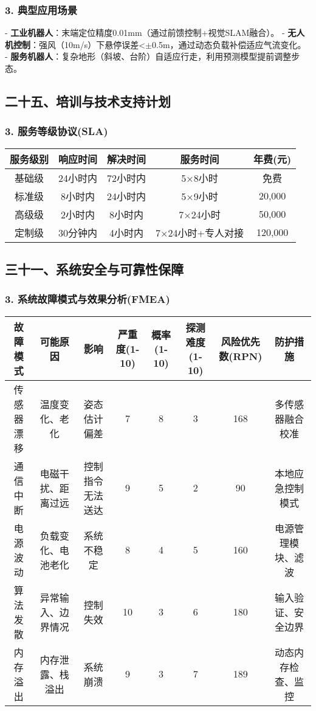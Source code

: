 \documentclass[12pt, a4paper]{article}
\begin{document}
\subsubsection{3. 典型应用场景}
- \textbf{工业机器人}：末端定位精度0.01mm（通过前馈控制+视觉SLAM融合）。
- \textbf{无人机控制}：强风（10m/s）下悬停误差<$\pm$0.5m，通过动态负载补偿适应气流变化。
- \textbf{服务机器人}：复杂地形（斜坡、台阶）自适应行走，利用预测模型提前调整步态。

\subsection{二十五、培训与技术支持计划}

\subsubsection{3. 服务等级协议(SLA)}

\begin{longtable}{|c|c|c|c|c|}
\hline
服务级别 & 响应时间 & 解决时间 & 服务时间 & 年费(元) \\
\hline
基础级 & 24小时内 & 72小时内 & 5×8小时 & 免费 \\
\hline
标准级 & 8小时内 & 24小时内 & 5×9小时 & 20,000 \\
\hline
高级级 & 2小时内 & 8小时内 & 7×24小时 & 50,000 \\
\hline
定制级 & 30分钟内 & 4小时内 & 7×24小时+专人对接 & 120,000 \\
\hline
\end{longtable}

\subsection{三十一、系统安全与可靠性保障}

\subsubsection{3. 系统故障模式与效果分析(FMEA)}

\begin{longtable}{|c|c|c|c|c|c|c|c|}
\hline
故障模式 & 可能原因 & 影响 & 严重度(1-10) & 概率(1-10) & 探测难度(1-10) & 风险优先数(RPN) & 防护措施 \\
\hline
传感器漂移 & 温度变化、老化 & 姿态估计偏差 & 7 & 8 & 3 & 168 & 多传感器融合校准 \\
\hline
通信中断 & 电磁干扰、距离过远 & 控制指令无法送达 & 9 & 5 & 2 & 90 & 本地应急控制模式 \\
\hline
电源波动 & 负载变化、电池老化 & 系统不稳定 & 8 & 4 & 5 & 160 & 电源管理模块、滤波 \\
\hline
算法发散 & 异常输入、边界情况 & 控制失效 & 10 & 3 & 6 & 180 & 输入验证、安全边界 \\
\hline
内存溢出 & 内存泄露、栈溢出 & 系统崩溃 & 9 & 3 & 7 & 189 & 动态内存检查、监控 \\
\hline
\end{longtable}
\end{document}
